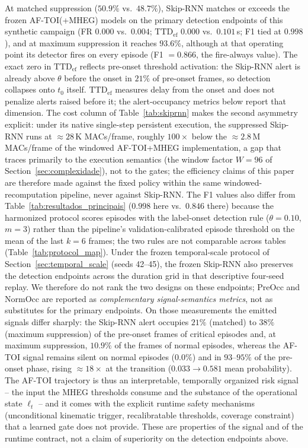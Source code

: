 \documentclass[a4paper,fleqn]{cas-dc}
\newcommand{\MHEG}{\mbox{MHEG}\xspace}
\begin{document}
{At matched suppression ($50.9\%$ vs.\ $48.7\%$), Skip-RNN matches or exceeds
the frozen \mbox{AF-TOI}(+\MHEG) models on the primary detection endpoints of
this synthetic campaign (FR $0.000$ vs.\ $0.004$; $\mathrm{TTD}_{\mathrm{ef}}$
$0.000$ vs.\ $0.101$\,s; F1 tied at $0.998$), and at maximum suppression it
reaches $93.6\%$, although at that operating point its detector fires on
every episode (F1 $=0.866$, the fire-always value). The exact zero in
$\mathrm{TTD}_{\mathrm{ef}}$ reflects pre-onset threshold activation: the
Skip-RNN alert is already above $\theta$ before the onset in $21\%$ of
pre-onset frames, so detection collapses onto $t_0$ itself.
$\mathrm{TTD}_{\mathrm{ef}}$ measures delay from the onset and does not
penalize alerts raised before it; the alert-occupancy metrics below report
that dimension. The cost column
of Table~\ref{tab:skiprnn} makes the second asymmetry explicit: under its
native single-step persistent execution, the suppressed Skip-RNN runs at
${\approx}28$\,K MACs/frame, roughly $100\times$ below the
${\approx}2.8$\,M MACs/frame of the windowed \mbox{AF-TOI}+\MHEG
implementation, a gap that traces primarily to the execution semantics (the
window factor $W{=}96$ of Section~\ref{sec:complexidade}), not to the gates; the
efficiency claims of this paper are therefore made against the fixed policy
within the same windowed-recomputation pipeline, never against Skip-RNN.
The F1 values also differ from Table~\ref{tab:resultados_principais}
($0.998$ here vs.\ $0.846$ there) because the harmonized protocol scores
episodes with the label-onset detection rule ($\theta{=}0.10$, $m{=}3$)
rather than the pipeline's validation-calibrated episode threshold on the
mean of the last $k{=}6$ frames; the two rules are not comparable across
tables (Table~\ref{tab:protocol_map}). Under the
frozen temporal-scale protocol of Section~\ref{sec:temporal_scale} (seeds
42--45), the frozen Skip-RNN also preserves the detection endpoints across
the duration grid in that descriptive four-seed replay. We therefore do not rank the two designs on these
endpoints; PreOcc and NormOcc are reported as \emph{complementary
signal-semantics metrics}, not as
substitutes for the primary endpoints. On those measurements the emitted
signals differ sharply: the Skip-RNN alert occupies $21\%$ (matched) to
$38\%$ (maximum suppression) of the pre-onset frames of critical episodes
and, at maximum suppression, $10.9\%$ of the frames of normal episodes,
whereas the \mbox{AF-TOI} signal remains silent on normal episodes ($0.0\%$)
and in $93$--$95\%$ of the pre-onset phase, rising ${\approx}18\times$ at the
transition ($0.033 \rightarrow 0.581$ mean probability). The \mbox{AF-TOI}
trajectory is thus an interpretable, temporally organized risk signal -- the
input the \MHEG thresholds consume and the substance of the operational state
$\ell_t$ -- and it comes with the explicit runtime safety mechanisms
(unconditional kinematic trigger, recalibratable thresholds, coverage
constraint) that a learned gate does not provide. These are properties of the
signal and of the runtime contract, not a claim of superiority on the
detection endpoints above.

}
\end{document}
